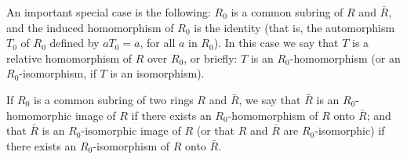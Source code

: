 An important special case is the following: $R_0$ is a common subring of $R$ and $\bar{R}$, and the induced homomorphism of $R_0$ is the identity (that is, the automorphism $T_0$ of $R_0$ defined by $aT_0 = a$, for all $a$ in $R_0$). In this case we say that $T$ is a relative homomorphism of $R$ over $R_0$, or briefly: $T$ is an $R_0$-homomorphism (or an $R_0$-isomorphism, if $T$ is an isomorphism).

If $R_0$ is a common subring of two rings $R$ and $\bar{R}$, we say that $\bar{R}$ is an $R_0$-homomorphic image of $R$ if there exists an $R_0$-homomorphism of $R$ onto $\bar{R}$; and that $\bar{R}$ is an $R_0$-isomorphic image of $R$ (or that $R$ and $\bar{R}$ are $R_0$-isomorphic) if there exists an $R_0$-isomorphism of $R$ onto $\bar{R}$.

